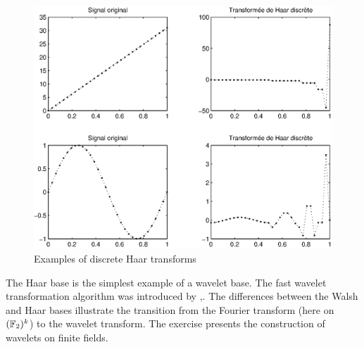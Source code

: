 \begin{exo}
\begin{figure}[ht]
\begin{center}
    \includegraphics [scale = 0.7]{images/transformee-haar.eps}
    \end{center}
    \caption{Examples of discrete Haar transforms}
              \label{fig-transforme-haar}
\end{figure}
The Haar base is the simplest example of a wavelet base. The fast wavelet transformation algorithm was introduced by ,{\upshape \cite{mallat}}. The differences between the Walsh and Haar bases illustrate the transition from the Fourier transform (here on $ (\mathbb{F}_2)^k $) to the wavelet transform. The exercise  presents the construction of wavelets on finite fields.
\end{exo}
 

